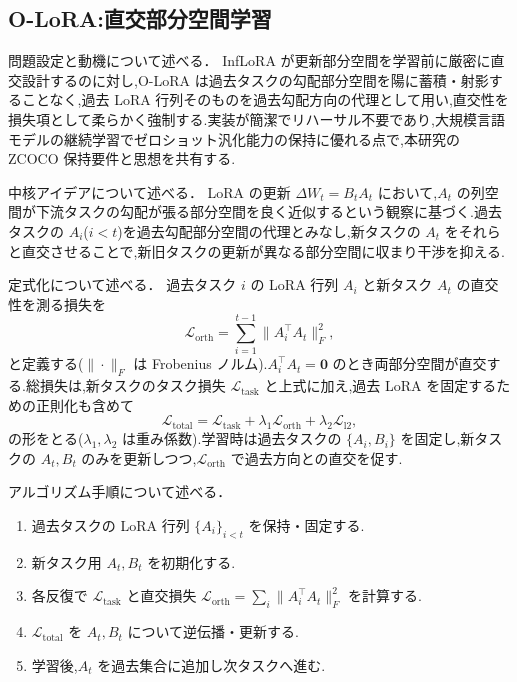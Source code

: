 \subsection{O-LoRA:直交部分空間学習}

問題設定と動機について述べる．
InfLoRA が更新部分空間を学習前に厳密に直交設計するのに対し,O-LoRA \cite{olora} は過去タスクの勾配部分空間を陽に蓄積・射影することなく,過去 LoRA 行列そのものを過去勾配方向の代理として用い,直交性を損失項として柔らかく強制する.実装が簡潔でリハーサル不要であり,大規模言語モデルの継続学習でゼロショット汎化能力の保持に優れる点で,本研究の ZCOCO 保持要件と思想を共有する.

中核アイデアについて述べる．
LoRA の更新 $\Delta W_t = B_t A_t$ において,$A_t$ の列空間が下流タスクの勾配が張る部分空間を良く近似するという観察に基づく.過去タスクの $A_i$($i < t$)を過去勾配部分空間の代理とみなし,新タスクの $A_t$ をそれらと直交させることで,新旧タスクの更新が異なる部分空間に収まり干渉を抑える.

定式化について述べる．
過去タスク $i$ の LoRA 行列 $A_i$ と新タスク $A_t$ の直交性を測る損失を
\begin{equation}
\mathcal{L}_{\text{orth}} = \sum_{i=1}^{t-1} \big\| A_i^\top A_t \big\|_F^2,
\end{equation}
と定義する($\|\cdot\|_F$ は Frobenius ノルム).$A_i^\top A_t = \mathbf{0}$ のとき両部分空間が直交する.総損失は,新タスクのタスク損失 $\mathcal{L}_{\text{task}}$ と上式に加え,過去 LoRA を固定するための正則化も含めて
\begin{equation}
\mathcal{L}_{\text{total}} = \mathcal{L}_{\text{task}} + \lambda_1 \mathcal{L}_{\text{orth}} + \lambda_2 \mathcal{L}_{\text{l2}},
\end{equation}
の形をとる($\lambda_1, \lambda_2$ は重み係数).学習時は過去タスクの $\{A_i, B_i\}$ を固定し,新タスクの $A_t, B_t$ のみを更新しつつ,$\mathcal{L}_{\text{orth}}$ で過去方向との直交を促す.

アルゴリズム手順について述べる．
\begin{enumerate}
\item 過去タスクの LoRA 行列 $\{A_i\}_{i<t}$ を保持・固定する.
\item 新タスク用 $A_t, B_t$ を初期化する.
\item 各反復で $\mathcal{L}_{\text{task}}$ と直交損失 $\mathcal{L}_{\text{orth}} = \sum_i \|A_i^\top A_t\|_F^2$ を計算する.
\item $\mathcal{L}_{\text{total}}$ を $A_t, B_t$ について逆伝播・更新する.
\item 学習後,$A_t$ を過去集合に追加し次タスクへ進む.
\end{enumerate}

